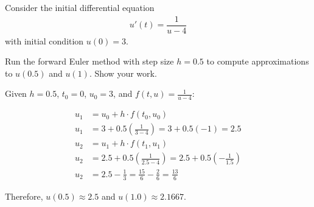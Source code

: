 \documentclass[reqno, answers]{exam}
\begin{document}
\begin{questions}
\begin{solution}
  \end{solution}

  \newpage
  \question[10]
  Consider the initial differential equation
  \begin{align*}
    u'(t) = \dfrac{1}{u - 4}
  \end{align*}
  with initial condition $u(0) = 3$.

  Run the forward Euler method with step size $h = 0.5$ to compute approximations to $u(0.5)$ and $u(1)$. Show your work.

  \begin{solution}

    Given $h = 0.5$, $t_0 = 0$, $u_0 = 3$, and $f(t, u) = \frac{1}{u-4}$:

    \begin{align*}
      u_1 & = u_0 + h \cdot f(t_0, u_0)                                                          \\
      u_1 & = 3 + 0.5 \left( \frac{1}{3-4} \right) = 3 + 0.5(-1) = 2.5                           \\
      u_2 & = u_1 + h \cdot f(t_1, u_1)                                                          \\
      u_2 & = 2.5 + 0.5 \left( \frac{1}{2.5-4} \right) = 2.5 + 0.5 \left( -\frac{1}{1.5} \right) \\
      u_2 & = 2.5 - \frac{1}{3} = \frac{15}{6} - \frac{2}{6} = \frac{13}{6}
    \end{align*}

    Therefore, $u(0.5) \approx 2.5$ and $u(1.0) \approx 2.1667$.
  \end{solution}

\end{questions}
\end{document}
